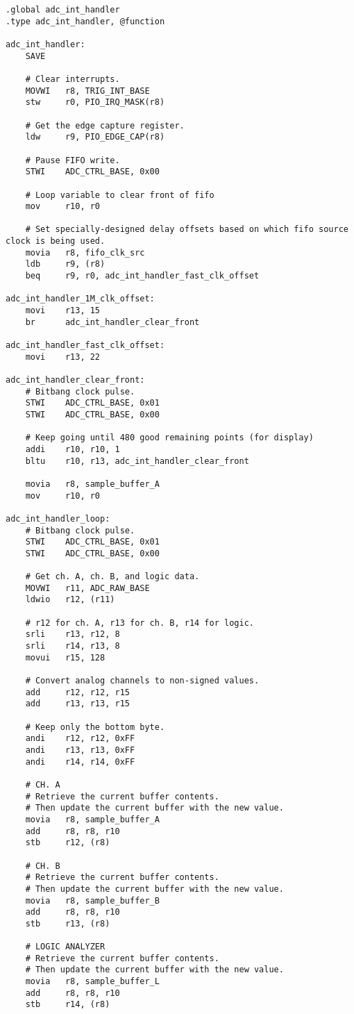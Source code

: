 \begin{lstlisting}
.global adc_int_handler
.type adc_int_handler, @function

adc_int_handler:
	SAVE

	# Clear interrupts.
	MOVWI	r8, TRIG_INT_BASE
	stw		r0, PIO_IRQ_MASK(r8)

	# Get the edge capture register.
	ldw		r9, PIO_EDGE_CAP(r8)

	# Pause FIFO write.
	STWI	ADC_CTRL_BASE, 0x00

	# Loop variable to clear front of fifo
	mov		r10, r0

	# Set specially-designed delay offsets based on which fifo source clock is being used.
	movia	r8, fifo_clk_src
	ldb		r9, (r8)
	beq		r9, r0, adc_int_handler_fast_clk_offset

adc_int_handler_1M_clk_offset:
	movi	r13, 15
	br		adc_int_handler_clear_front

adc_int_handler_fast_clk_offset:
	movi	r13, 22

adc_int_handler_clear_front:
	# Bitbang clock pulse.
	STWI	ADC_CTRL_BASE, 0x01
	STWI	ADC_CTRL_BASE, 0x00

	# Keep going until 480 good remaining points (for display)
	addi	r10, r10, 1
	bltu	r10, r13, adc_int_handler_clear_front

	movia	r8, sample_buffer_A
	mov		r10, r0

adc_int_handler_loop:
	# Bitbang clock pulse.
	STWI	ADC_CTRL_BASE, 0x01
	STWI	ADC_CTRL_BASE, 0x00

	# Get ch. A, ch. B, and logic data.
	MOVWI	r11, ADC_RAW_BASE
	ldwio	r12, (r11)

	# r12 for ch. A, r13 for ch. B, r14 for logic.
	srli	r13, r12, 8
	srli	r14, r13, 8
	movui	r15, 128

	# Convert analog channels to non-signed values.
	add		r12, r12, r15
	add		r13, r13, r15

	# Keep only the bottom byte.
	andi	r12, r12, 0xFF
	andi	r13, r13, 0xFF
	andi	r14, r14, 0xFF

	# CH. A
	# Retrieve the current buffer contents.
	# Then update the current buffer with the new value.
	movia	r8, sample_buffer_A
	add		r8, r8, r10
	stb		r12, (r8)

	# CH. B
	# Retrieve the current buffer contents.
	# Then update the current buffer with the new value.
	movia	r8, sample_buffer_B
	add		r8, r8, r10
	stb		r13, (r8)

	# LOGIC ANALYZER
	# Retrieve the current buffer contents.
	# Then update the current buffer with the new value.
	movia	r8, sample_buffer_L
	add		r8, r8, r10
	stb		r14, (r8)


\end{lstlisting}
